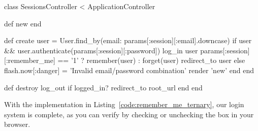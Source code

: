 \newpage

\begin{codelisting}
\label{code:remember_me_ternary}
\begin{code}
class SessionsController < ApplicationController

  def new
  end

  def create
    user = User.find_by(email: params[:session][:email].downcase)
    if user && user.authenticate(params[:session][:password])
      log_in user
      params[:session][:remember_me] == '1' ? remember(user) : forget(user)
      redirect_to user
    else
      flash.now[:danger] = 'Invalid email/password combination'
      render 'new'
    end
  end

  def destroy
    log_out if logged_in?
    redirect_to root_url
  end
end
\end{code}
\end{codelisting}

\noindent With the implementation in Listing~\ref{code:remember_me_ternary}, our login system is complete, as you can verify by checking or unchecking the box in your browser.

